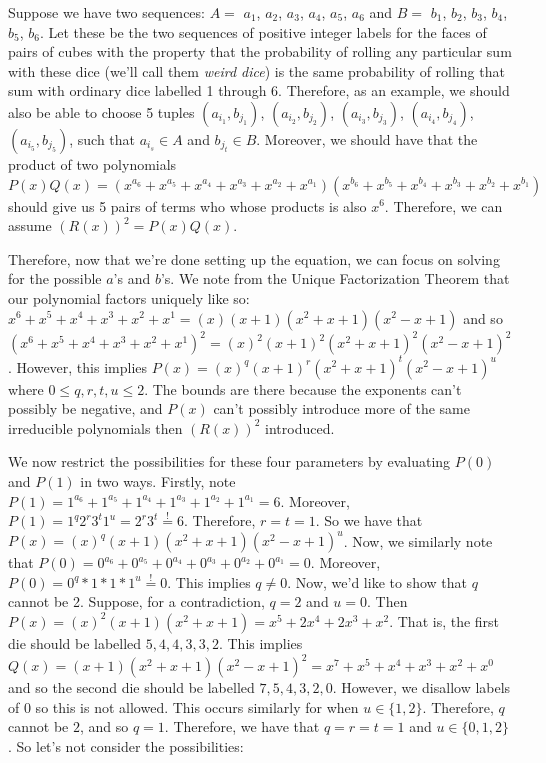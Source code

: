 \documentclass[12pt]{report}
\begin{document}
Suppose we have two sequences: $A=$ $a_{1}$, $a_{2}$, $a_{3}$, $a_{4}$, $a_{5}$, $a_{6}$ and $B=$ $b_{1}$,
$b_{2}$, $b_{3}$, $b_{4}$, $b_{5}$, $b_{6}$. Let these be the two sequences of positive integer labels for the
faces of pairs of cubes with the property that the probability of rolling any particular sum with these dice
(we'll call them \textit{weird dice}) is the same probability of rolling that sum with ordinary dice labelled
1 through 6. Therefore, as an example, we should also be able to choose 5 tuples $(a_{i_{1}}, b_{j_{1}})$,
$(a_{i_{2}}, b_{j_{2}})$, $(a_{i_{3}}, b_{j_{3}})$, $(a_{i_{4}}, b_{j_{4}})$, $(a_{i_{5}}, b_{j_{5}})$, such
that $a_{i_{s}} \in A$ and $b_{j_{t}} \in B$. Moreover, we should have that the product of two polynomials
$P(x)Q(x)=(x^{a_{6}}+x^{a_{5}}+x^{a_{4}}+x^{a_{3}}+x^{a_{2}}+x^{a_{1}})
(x^{b_{6}}+x^{b_{5}}+x^{b_{4}}+x^{b_{3}}+x^{b_{2}}+x^{b_{1}})$
should give us 5 pairs of terms who whose products is also $x^{6}$. Therefore, we can assume
$(R(x))^{2}=P(x)Q(x)$.

Therefore, now that we're done setting up the equation, we can focus on solving for the possible $a$'s and
$b$'s. We note from the Unique Factorization Theorem that our polynomial factors uniquely like so:
$x^{6}+x^{5}+x^{4}+x^{3}+x^{2}+x^{1} = (x)(x+1)(x^{2}+x+1)(x^{2}-x+1)$ and so
$(x^{6}+x^{5}+x^{4}+x^{3}+x^{2}+x^{1})^2 = (x)^{2}(x+1)^{2}(x^{2}+x+1)^{2}(x^{2}-x+1)^{2}$. However, this
implies $P(x)=(x)^{q}(x+1)^{r}(x^{2}+x+1)^{t}(x^{2}-x+1)^{u}$ where $0\leq q,r,t,u \leq 2$. The bounds are
there because the exponents can't possibly be negative, and $P(x)$ can't possibly introduce more of the same
irreducible polynomials then $(R(x))^2$ introduced.

We now restrict the possibilities for these four parameters by evaluating $P(0)$ and $P(1)$ in two ways.
Firstly, note $P(1)=1^{a_{6}}+1^{a_{5}}+1^{a_{4}}+1^{a_{3}}+1^{a_{2}}+1^{a_{1}}=6$. Moreover,
$P(1)=1^{q}2^{r}3^{t}1^{u}=2^{r}3^{t} \stackrel{!}{=} 6$. Therefore, $r=t=1$. So we have that
$P(x)=(x)^{q}(x+1)(x^{2}+x+1)(x^{2}-x+1)^{u}$. Now, we similarly note that
$P(0)=0^{a_{6}}+0^{a_{5}}+0^{a_{4}}+0^{a_{3}}+0^{a_{2}}+0^{a_{1}}=0$. Moreover,
$P(0)=0^{q}*1*1*1^{u} \stackrel{!}{=} 0$. This implies $q \neq 0$. Now, we'd like to show that $q$ cannot be
2. Suppose, for a contradiction, $q=2$ and $u=0$. Then
$P(x)=(x)^{2}(x+1)(x^{2}+x+1)=x^{5}+2x^{4}+2x^{3}+x^{2}$. That is, the first die should be labelled
$5,4,4,3,3,2$. This implies $Q(x)=(x+1)(x^{2}+x+1)(x^{2}-x+1)^{2}=x^{7}+x^{5}+x^{4}+x^{3}+x^{2}+x^{0}$ and so
the second die should be labelled $7,5,4,3,2,0$. However, we disallow labels of $0$ so this is not allowed.
This occurs similarly for when $u\in \{1,2\}$. Therefore, $q$ cannot be $2$, and so $q=1$. Therefore, we have
that $q=r=t=1$ and $u\in \{0,1,2\}$. So let's not consider the possibilities:
\end{document}
